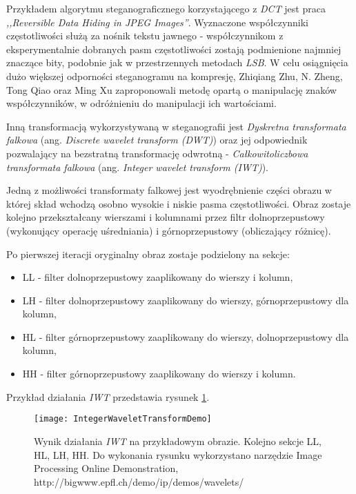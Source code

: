 {{{            %
            Przykładem algorytmu steganograficznego korzystającego z \textit{DCT} jest praca \textit{,,Reversible Data
            Hiding in JPEG Images''}\cite{Huang2016ReversibleDH, Li2007ASM}. Wyznaczone współczynniki częstotliwości
            służą za nośnik tekstu jawnego - współczynnikom z eksperymentalnie dobranych pasm częstotliwości zostają
            podmienione najmniej znaczące bity, podobnie jak w przestrzennych metodach \textit{LSB}. W celu osiągnięcia
            dużo większej odporności steganogramu na kompresję, Zhiqiang Zhu, N. Zheng, Tong Qiao oraz Ming Xu
            zaproponowali metodę opartą o manipulację znaków współczynników, w odróżnieniu do manipulacji ich
            wartościami\cite{Zhu2019RobustSB}.

            Inną transformacją wykorzystywaną w steganografii jest \textit{Dyskretna transformata falkowa} (ang.
            \textit{Discrete wavelet transform (DWT)}) oraz jej odpowiednik pozwalający na bezstratną transformację
            odwrotną - \textit{Całkowitoliczbowa transformata falkowa} (ang. \textit{Integer wavelet transform
            (IWT)})\cite{Xuan2005LosslessDH}.

            Jedną z możliwości transformaty falkowej jest wyodrębnienie części obrazu w której skład wchodzą osobno
            wysokie i niskie pasma częstotliwości. Obraz zostaje kolejno przekształcany wierszami i kolumnami przez
            filtr dolnoprzepustowy (wykonujący operację uśredniania) i górnoprzepustowy (obliczający różnicę).

            Po pierwszej iteracji oryginalny obraz zostaje podzielony na sekcje:
            \begin{itemize}
                \item LL - filter dolnoprzepustowy zaaplikowany do wierszy i kolumn,
                \item LH - filter dolnoprzepustowy zaaplikowany do wierszy, górnoprzepustowy dla kolumn,
                \item HL - filter górnoprzepustowy zaaplikowany do wierszy, dolnoprzepustowy dla kolumn,
                \item HH - filter górnoprzepustowy zaaplikowany do wierszy i kolumn.
            \end{itemize}

            Przykład działania \textit{IWT} przedstawia rysunek \ref{fig:iwtdemo}.

            \begin{figure}
                \centering
                \texttt{[image: IntegerWaveletTransformDemo]}
                \caption{Wynik działania \textit{IWT} na przykładowym obrazie. Kolejno sekcje LL, HL, LH, HH. Do wykonania
                    rysunku wykorzystano narzędzie Image Processing Online Demonstration,
                    http://bigwww.epfl.ch/demo/ip/demos/wavelets/}
                \label{fig:iwtdemo}
            \end{figure}


}}}

